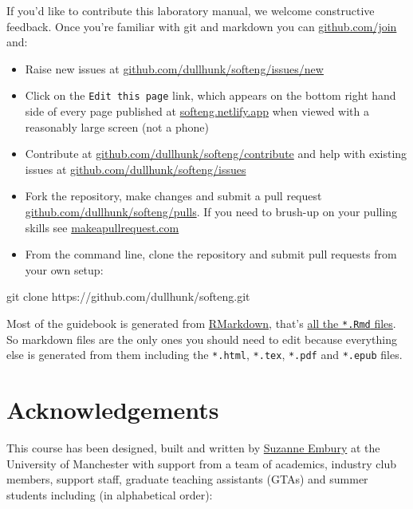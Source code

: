 \documentclass[
]{book}
\newenvironment{Shaded}{\begin{snugshade}}{\end{snugshade}}
\newcommand{\NormalTok}[1]{#1}
\providecommand{\tightlist}{%
  \setlength{\itemsep}{0pt}\setlength{\parskip}{0pt}}
\begin{document}
If you'd like to contribute this laboratory manual, we welcome constructive feedback. Once you're familiar with git and markdown you can \href{https://github.com/join}{github.com/join} and:

\begin{itemize}
\tightlist
\item
  Raise new issues at \href{https://github.com/dullhunk/softeng/issues/new}{github.com/dullhunk/softeng/issues/new}
\item
  Click on the \texttt{Edit\ this\ page} link, which appears on the bottom right hand side of every page published at \href{https://softeng.netlify.app}{softeng.netlify.app} when viewed with a reasonably large screen (not a phone)
\item
  Contribute at \href{https://github.com/dullhunk/softeng/contribute}{github.com/dullhunk/softeng/contribute} and help with existing issues at \href{https://github.com/dullhunk/softeng/issues}{github.com/dullhunk/softeng/issues}
\item
  Fork the repository, make changes and submit a pull request \href{https://github.com/dullhunk/softeng/pulls}{github.com/dullhunk/softeng/pulls}. If you need to brush-up on your pulling skills see \href{http://makeapullrequest.com/}{makeapullrequest.com}
\item
  From the command line, clone the repository and submit pull requests from your own setup:
\end{itemize}

\begin{Shaded}
\begin{Highlighting}[]
\NormalTok{git clone https://github.com/dullhunk/softeng.git}
\end{Highlighting}
\end{Shaded}

Most of the guidebook is generated from \href{https://en.wikipedia.org/wiki/Markdown}{RMarkdown}, that's \href{https://github.com/dullhunk/softeng/search?l=RMarkdown}{all the \texttt{*.Rmd} files}. So markdown files are the only ones you should need to edit because everything else is generated from them including the \texttt{*.html}, \texttt{*.tex}, \texttt{*.pdf} and \texttt{*.epub} files.

\hypertarget{teambury}{%
\section{Acknowledgements}\label{teambury}}

This course has been designed, built and written by \href{http://www.cs.man.ac.uk/~embury/}{Suzanne Embury} at the University of Manchester with support from a team of academics, industry club members, support staff, graduate teaching assistants (GTAs) and summer students including (in alphabetical order):
\end{document}
